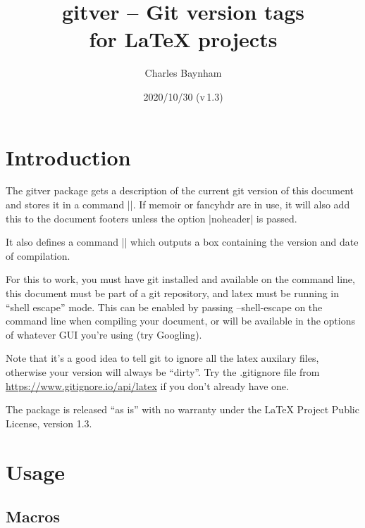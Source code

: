 \documentclass[a4paper]{ltxdoc}
\begin{document}
\title{\textsf{gitver} -- Git version tags \\ 
for \LaTeX{} projects}
\author{Charles Baynham}
\date{2020/10/30 (v\,1.3)}

\maketitle

\section{Introduction}

The \textsf{gitver} package gets a description of the current git version of this
document and stores it in a command |\gitVer|. If memoir or fancyhdr are in use, it
will also add this to the document footers unless the option |noheader| is
passed.

It also defines a command |\versionBox| which outputs a box containing the
version and date of compilation. 

For this to work, you must have git installed and available on the command
line, this document must be part of a git repository, and latex must be
running in ``shell escape'' mode. This can be enabled by passing \textsf{--shell-escape}
on the command line when compiling your document, or will be available in the
options of whatever GUI you're using (try Googling).

Note that it's a good idea to tell git to ignore all the latex auxilary files,
otherwise your version will always be ``dirty''. Try the \textsf{.gitignore} file from
\url{https://www.gitignore.io/api/latex} if you don't already have
one.

The package is released ``as is'' with no warranty under the LaTeX Project Public
License, version 1.3.

\section{Usage}

\subsection{Macros} %
\label{sub:macros}
\end{document}
